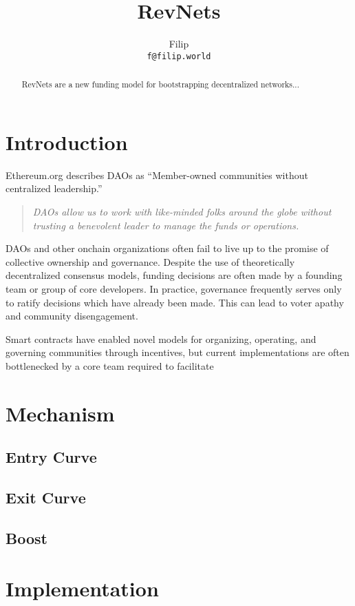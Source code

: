 \documentclass{article}
\title{RevNets}
\author{Filip\\ \texttt{f@filip.world}}
\begin{document}
\maketitle

\begin{abstract}
  RevNets are a new funding model for bootstrapping decentralized networks...
\end{abstract}

\section{Introduction}

Ethereum.org\cite{daos} describes DAOs as ``Member-owned communities without centralized leadership.''

\begin{quote}
  \textit{DAOs allow us to work with like-minded folks around the globe without trusting a benevolent leader to manage the funds or operations.}
\end{quote}

DAOs and other onchain organizations often fail to live up to the promise of collective ownership and governance. Despite the use of theoretically decentralized consensus models, funding decisions are often made by a founding team or group of core developers. In practice, governance frequently serves only to ratify decisions which have already been made. This can lead to voter apathy and community disengagement.

Smart contracts have enabled novel models for organizing, operating, and governing communities through incentives, but current implementations are often bottlenecked by a core team required to facilitate

\section{Mechanism}

\subsection{Entry Curve}
\subsection{Exit Curve}
\subsection{Boost}

\section{Implementation}



\end{document}
